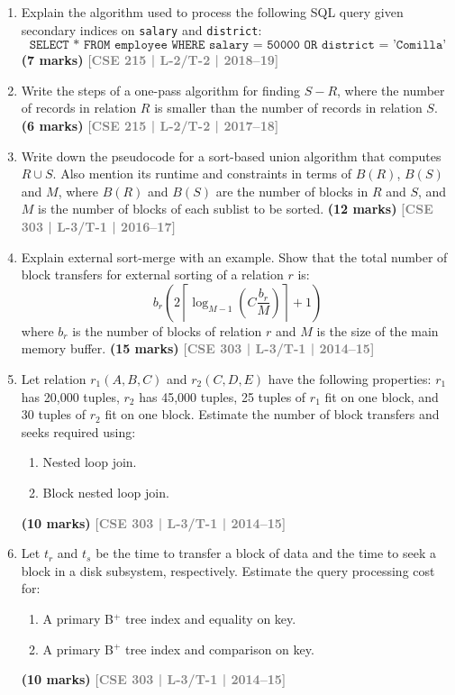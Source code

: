 \documentclass[12pt]{article}
\newcommand{\yr}[1]{\hfill\textcolor{gray}{\small\textbf{[#1]}}}
\newcommand{\mk}[1]{\textcolor{orange!70!black}{\small\textbf{(#1 marks)}}}
\begin{document}
\begin{enumerate}
\item Explain the algorithm used to process the following SQL query given secondary indices on \texttt{salary} and \texttt{district}:
\[\texttt{SELECT * FROM employee WHERE salary = 50000 OR district = 'Comilla'}\]
\mk{7} \yr{CSE 215 | L-2/T-2 | 2018--19}


\item Write the steps of a one-pass algorithm for finding $S - R$, where the number of records in relation $R$ is smaller than the number of records in relation $S$.
\mk{6} \yr{CSE 215 | L-2/T-2 | 2017--18}


\item Write down the pseudocode for a sort-based union algorithm that computes $R \cup S$. Also mention its runtime and constraints in terms of $B(R)$, $B(S)$ and $M$, where $B(R)$ and $B(S)$ are the number of blocks in $R$ and $S$, and $M$ is the number of blocks of each sublist to be sorted.
\mk{12} \yr{CSE 303 | L-3/T-1 | 2016--17}


\item Explain external sort-merge with an example. Show that the total number of block transfers for external sorting of a relation $r$ is:
\[b_r\!\left(2\left\lceil\log_{M-1}(C\dfrac{b_r}{M})\right\rceil + 1\right)\]
where $b_r$ is the number of blocks of relation $r$ and $M$ is the size of the main memory buffer.
\mk{15} \yr{CSE 303 | L-3/T-1 | 2014--15}


\item Let relation $r_1(A, B, C)$ and $r_2(C, D, E)$ have the following properties: $r_1$ has 20,000 tuples, $r_2$ has 45,000 tuples, 25 tuples of $r_1$ fit on one block, and 30 tuples of $r_2$ fit on one block. Estimate the number of block transfers and seeks required using:
\begin{enumerate}
  \item Nested loop join.
  \item Block nested loop join.
\end{enumerate}
\mk{10} \yr{CSE 303 | L-3/T-1 | 2014--15}


\item Let $t_r$ and $t_s$ be the time to transfer a block of data and the time to seek a block in a disk subsystem, respectively. Estimate the query processing cost for:
\begin{enumerate}
  \item A primary B$^+$ tree index and equality on key.
  \item A primary B$^+$ tree index and comparison on key.
\end{enumerate}
\mk{10} \yr{CSE 303 | L-3/T-1 | 2014--15}



\end{enumerate}
\end{document}
